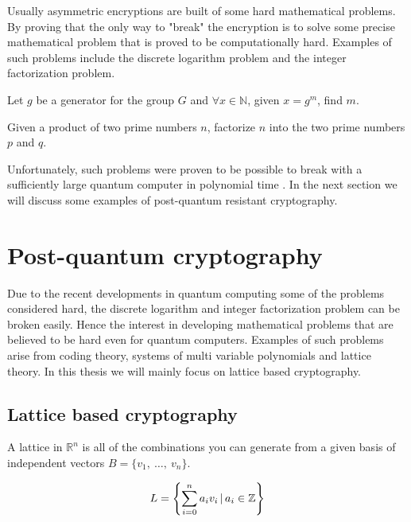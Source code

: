 Usually asymmetric encryptions are built of some hard mathematical problems.
By proving that the only way to "break" the encryption is to solve some
precise mathematical problem that is proved to be computationally hard.
Examples of such problems include the discrete logarithm problem and the
integer factorization problem.

\begin{definition}

    Let $g$ be a generator for the group $G$ and $\forall x \in \mathbb{N}$,
    given $x = g^m$, find $m$.

\end{definition}

\begin{definition}

    Given a product of two prime numbers $n$, factorize $n$ into the two prime
    numbers $p$ and $q$.

\end{definition}

Unfortunately, such problems were proven to be possible to break with a
sufficiently large quantum computer in polynomial time \citep{ShorQuantum}. In
the next section we will discuss some examples of post-quantum resistant
cryptography.


\section{Post-quantum cryptography}

Due to the recent developments in quantum computing some of the problems
considered hard, the discrete logarithm and integer factorization problem can
be broken easily. Hence the interest in developing mathematical problems that
are believed to be hard even for quantum computers. Examples of such problems
arise from coding theory, systems of multi variable polynomials and lattice
theory. In this thesis we will mainly focus on lattice based cryptography.


\subsection{Lattice based cryptography}

\begin{definition}
    A lattice in $\mathbb{R}^n$ is all of the combinations you can generate
    from a given basis of independent vectors $B = \{v_1,\ \ldots,\ v_n\}$.

    \[L = \left\{ \sum_{i = 0}^n a_iv_i \, | \, a_i \in \mathbb{Z} \right\}\]
\end{definition}


